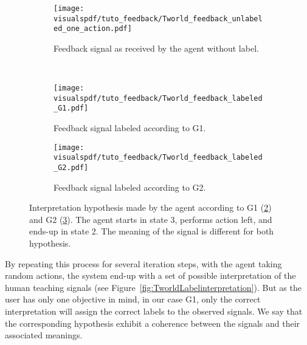 \begin{figure}[!htbp]
    \centering
    \begin{subfigure}[b]{\tworldsize\columnwidth}
        \centering
        \texttt{[image: \\visualspdf/tuto\_feedback/Tworld\_feedback\_unlabeled\_one\_action.pdf]}
        \caption{Feedback signal as received by the agent without label.}
        \label{fig:TworldLabelunknown}
    \end{subfigure}\\
    \begin{subfigure}[b]{\tworldsize\columnwidth}
        \centering
        \texttt{[image: \\visualspdf/tuto\_feedback/Tworld\_feedback\_labeled\_G1.pdf]}
        \caption{Feedback signal labeled according to G1.}
        \label{fig:TworldLabelG1}
    \end{subfigure}
    \begin{subfigure}[b]{\tworldsize\columnwidth}
        \centering
        \texttt{[image: \\visualspdf/tuto\_feedback/Tworld\_feedback\_labeled\_G2.pdf]}
        \caption{Feedback signal labeled according to G2.}
        \label{fig:TworldLabelG2}
    \end{subfigure}
    \caption{Interpretation hypothesis made by the agent according to G1 (\ref{fig:TworldLabelG1}) and G2 (\ref{fig:TworldLabelG2}). The agent starts in state 3, performs action left, and ends-up in state 2. The meaning of the signal is different for both hypothesis.}
    \label{fig:TworldLabelOneStep}
\end{figure}

By repeating this process for several iteration steps, with the agent taking random actions, the system end-up with a set of possible interpretation of the human teaching signals (see Figure~\ref{fig:TworldLabelinterpretation}). But as the user has only one objective in mind, in our case G1, only the correct interpretation will assign the correct labels to the observed signals. We say that the corresponding hypothesis exhibit a coherence between the signals and their associated meanings. 


        
